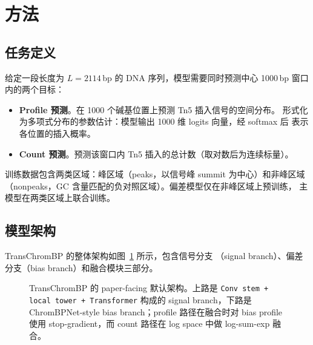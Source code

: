 \documentclass[11pt,a4paper]{ctexart}
\begin{document}
\section{方法}
\label{sec:method}

\subsection{任务定义}
\label{sec:task}

给定一段长度为 $L = 2114$\,bp 的 DNA 序列，模型需要同时预测中心 1000\,bp 窗口
内的两个目标：

\begin{itemize}[leftmargin=2em]
  \item \textbf{Profile 预测}。在 1000 个碱基位置上预测 Tn5 插入信号的空间分布。
  形式化为多项式分布的参数估计：模型输出 1000 维 logits 向量，经 softmax 后
  表示各位置的插入概率。
  \item \textbf{Count 预测}。预测该窗口内 Tn5 插入的总计数（取对数后为连续标量）。
\end{itemize}

训练数据包含两类区域：峰区域（peaks，以信号峰 summit 为中心）和非峰区域
（nonpeaks，GC 含量匹配的负对照区域）。偏差模型仅在非峰区域上预训练，
主模型在两类区域上联合训练。

\subsection{模型架构}
\label{sec:arch}

TransChromBP 的整体架构如图~\ref{fig:arch} 所示，包含信号分支
（signal branch）、偏差分支（bias branch）和融合模块三部分。

\begin{figure}[H]
\centering
\resizebox{\textwidth}{!}{}
\caption{TransChromBP 的 paper-facing 默认架构。上路是 \texttt{Conv stem + local tower + Transformer}
构成的 signal branch，下路是 ChromBPNet-style bias branch；profile 路径在融合时对
bias profile 使用 stop-gradient，而 count 路径在 log space 中做 log-sum-exp 融合。}
\label{fig:arch}
\end{figure}
\end{document}
